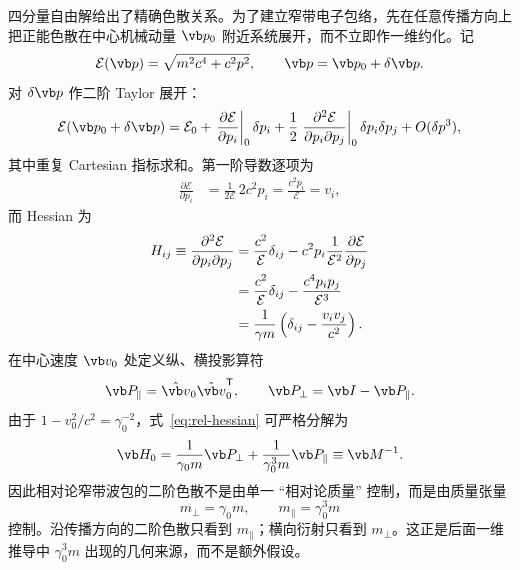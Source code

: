 四分量自由解给出了精确色散关系。为了建立窄带电子包络，先在任意传播方向上把正能色散在中心机械动量 $\vb p_0$ 附近系统展开，而不立即作一维约化。记
\begin{equation}
\mathcal E(\vb p)=\sqrt{m^2c^4+c^2p^2},
\qquad
\vb p=\vb p_0+\delta\vb p.
\end{equation}
对 $\delta\vb p$ 作二阶 Taylor 展开：
\begin{equation}
\mathcal E(\vb p_0+\delta\vb p)
=\mathcal E_0
+\left.\frac{\partial\mathcal E}{\partial p_i}\right|_0\delta p_i
+\frac12\left.\frac{\partial^2\mathcal E}{\partial p_i\partial p_j}\right|_0
\delta p_i\delta p_j
+O(\delta p^3),
\label{eq:E-taylor-vector}
\end{equation}
其中重复 Cartesian 指标求和。第一阶导数逐项为
\begin{align}
\frac{\partial\mathcal E}{\partial p_i}
&=\frac{1}{2\mathcal E}\,2c^2p_i
=\frac{c^2p_i}{\mathcal E}
=v_i,
\label{eq:E-first-derivative}
\end{align}
而 Hessian 为
\begin{align}
H_{ij}
\equiv\frac{\partial^2\mathcal E}{\partial p_i\partial p_j}
&=\frac{c^2}{\mathcal E}\delta_{ij}
-c^2p_i\frac{1}{\mathcal E^2}
\frac{\partial\mathcal E}{\partial p_j}\notag\\
&=\frac{c^2}{\mathcal E}\delta_{ij}
-\frac{c^4p_ip_j}{\mathcal E^3}\notag\\
&=\frac{1}{\gamma m}
\left(\delta_{ij}-\frac{v_iv_j}{c^2}\right).
\label{eq:rel-hessian}
\end{align}
在中心速度 $\vb v_0$ 处定义纵、横投影算符
\begin{equation}
\vb P_\parallel=\hat{\vb v}_0\hat{\vb v}_0^{\mathsf T},
\qquad
\vb P_\perp=\vb I-\vb P_\parallel.
\label{eq:projectors-velocity}
\end{equation}
由于
\(
1-v_0^2/c^2=\gamma_0^{-2}
\)，式~\cref{eq:rel-hessian} 可严格分解为
\begin{equation}
{
\vb H_0
=\frac{1}{\gamma_0m}\vb P_\perp
+\frac{1}{\gamma_0^3m}\vb P_\parallel
\equiv\vb M^{-1}.}
\label{eq:mass-tensor-inverse}
\end{equation}
因此相对论窄带波包的二阶色散不是由单一 ``相对论质量'' 控制，而是由质量张量
\begin{equation}
{
m_\perp=\gamma_0m,
\qquad
m_\parallel=\gamma_0^3m}
\label{eq:transverse-longitudinal-mass}
\end{equation}
控制。沿传播方向的二阶色散只看到 $m_\parallel$；横向衍射只看到 $m_\perp$。这正是后面一维推导中 $\gamma_0^3m$ 出现的几何来源，而不是额外假设。

